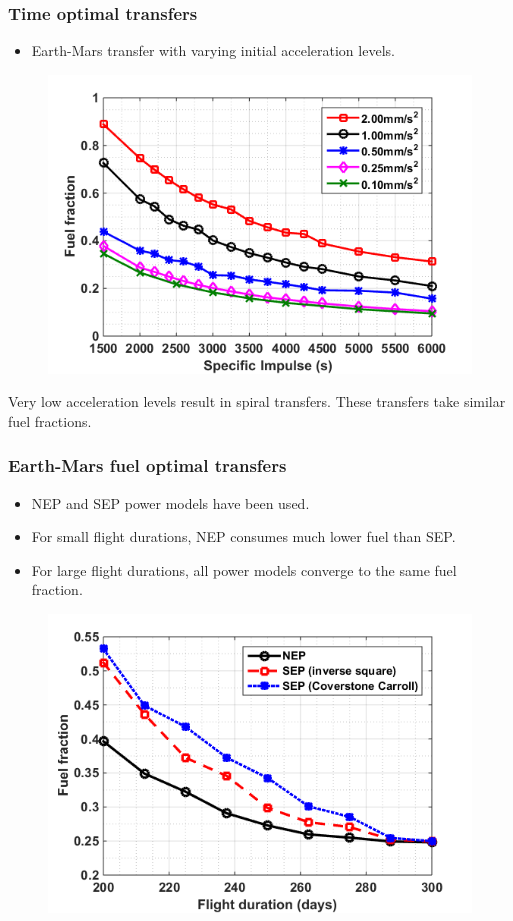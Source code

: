 \documentclass{beamer}
\begin{document}
\begin{frame}
	\frametitle{Time optimal transfers}
	\vspace{-5mm}
	\begin{itemize}
		\item Earth-Mars transfer with varying initial acceleration levels.
	\end{itemize}
	\vspace{-6mm}
	\begin{figure}
		\centering\includegraphics[width=0.65\linewidth]{Imgs/Fuelfrac_isp.png}
	\end{figure}
Very low acceleration levels result in spiral transfers. These transfers take similar fuel fractions.
\end{frame}


\begin{frame}
	\frametitle{Earth-Mars fuel optimal transfers}
	\vspace{-3mm}
	\begin{itemize}
		\item NEP and SEP power models have been used.
		\item For small flight durations, NEP consumes much lower fuel than SEP.
		\item For large flight durations, all power models converge to the same fuel fraction.
	\end{itemize}
	\vspace{-3.25mm}
	\begin{figure}
		\centering\includegraphics[width=0.60\linewidth]{Imgs/FuelOptParam.png}
	\end{figure}
\end{frame}
\end{document}

